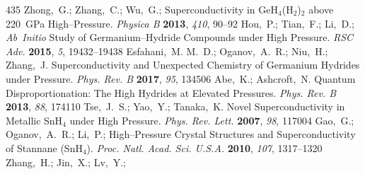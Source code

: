 \documentclass[12pt,letterpaper,oneside]{article}
\begin{document}
\begin{mcitethebibliography}{435}
Zhong,~G.; Zhang,~C.; Wu,~G.; 
  Superconductivity in GeH$_4$(H$_2$)$_2$ above 220~GPa High--Pressure.
  \emph{Physica B} \textbf{2013}, \emph{410}, 90--92\relax
\mciteBstWouldAddEndPuncttrue
\mciteSetBstMidEndSepPunct{\mcitedefaultmidpunct}
{\mcitedefaultendpunct}{\mcitedefaultseppunct}\relax
\EndOfBibitem
{}
Hou,~P.; Tian,~F.; Li,~D.;   \emph{Ab~Initio} Study
  of Germanium--Hydride Compounds under High Pressure. \emph{RSC Adv.}
  \textbf{2015}, \emph{5}, 19432--19438\relax
\mciteBstWouldAddEndPuncttrue
\mciteSetBstMidEndSepPunct{\mcitedefaultmidpunct}
{\mcitedefaultendpunct}{\mcitedefaultseppunct}\relax
\EndOfBibitem
{}
Esfahani,~M. M.~D.; Oganov,~A.~R.; Niu,~H.; Zhang,~J. Superconductivity and
  Unexpected Chemistry of Germanium Hydrides under Pressure. \emph{Phys. Rev.
  B} \textbf{2017}, \emph{95}, 134506\relax
\mciteBstWouldAddEndPuncttrue
\mciteSetBstMidEndSepPunct{\mcitedefaultmidpunct}
{\mcitedefaultendpunct}{\mcitedefaultseppunct}\relax
\EndOfBibitem
{}
Abe,~K.; Ashcroft,~N. Quantum Disproportionation: The High Hydrides at Elevated
  Pressures. \emph{Phys. Rev. B} \textbf{2013}, \emph{88}, 174110\relax
\mciteBstWouldAddEndPuncttrue
\mciteSetBstMidEndSepPunct{\mcitedefaultmidpunct}
{\mcitedefaultendpunct}{\mcitedefaultseppunct}\relax
\EndOfBibitem
{}
Tse,~J.~S.; Yao,~Y.; Tanaka,~K. Novel Superconductivity in Metallic SnH$_4$
  under High Pressure. \emph{Phys. Rev. Lett.} \textbf{2007}, \emph{98},
  117004\relax
\mciteBstWouldAddEndPuncttrue
\mciteSetBstMidEndSepPunct{\mcitedefaultmidpunct}
{\mcitedefaultendpunct}{\mcitedefaultseppunct}\relax
\EndOfBibitem
{}
Gao,~G.; Oganov,~A.~R.; Li,~P.;   High--Pressure
  Crystal Structures and Superconductivity of Stannane (SnH$_4$). \emph{Proc.
  Natl. Acad. Sci. U.S.A.} \textbf{2010}, \emph{107}, 1317--1320\relax
\mciteBstWouldAddEndPuncttrue
\mciteSetBstMidEndSepPunct{\mcitedefaultmidpunct}
{\mcitedefaultendpunct}{\mcitedefaultseppunct}\relax
\EndOfBibitem
{}
Zhang,~H.; Jin,~X.; Lv,~Y.; 

\end{mcitethebibliography}
\end{document}
